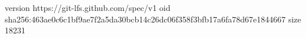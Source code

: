 version https://git-lfs.github.com/spec/v1
oid sha256:463ae0c6c1bf9ae7f2a5da30bcb14c26dc06f358f3bfb17a6fa78d67e1844667
size 18231
